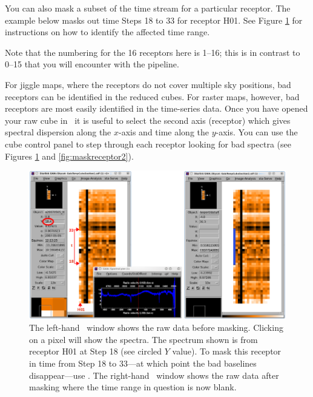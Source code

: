 \documentclass[11pt,oneside,chapters]{starlink}
\begin{document}
\begin{terminalv}
\end{terminalv}
You can also mask a subset of the time stream for a particular
receptor. The example below masks out time Steps 18 to 33 for receptor
H01. See Figure \ref{fig:maskreceptor} for instructions on how to
identify the affected time range.
\begin{terminalv}
\end{terminalv}
Note that the numbering for the 16 receptors here is 1--16; this is in
contrast to 0--15 that you will encounter with the pipeline.

For jiggle maps, where the receptors do not cover multiple sky
positions, bad receptors can be identified in the reduced cubes. For
raster maps, however, bad receptors are most easily identified in the
time-series data. Once you have opened your raw cube in \gaia\ it is
useful to select the second axis (receptor) which gives spectral
dispersion along the $x$-axis and time along the $y$-axis. You can use
the cube control panel to step through each receptor looking for bad
spectra (see Figures \ref{fig:maskreceptor} and
\ref{fig:maskreceptor2}).

\begin{figure}[h!]
\begin{center}
\includegraphics[width=1\linewidth]{sc20_maskreceptor}
\caption[Identifying bad receptors in the raw data.]{\label{fig:maskreceptor}
  The left-hand \gaia\ window shows the raw data before masking.
  Clicking on a pixel will show the spectra. The spectrum shown is from
  receptor H01 at Step 18 (see circled $Y$ value). To mask this receptor
  in time from Step 18 to 33---at which point the bad baselines
  disappear---use \chpix. The right-hand \gaia\ window shows the raw
  data after masking where the time range in question is now blank.}
\end{center}
\end{figure}
\end{document}
